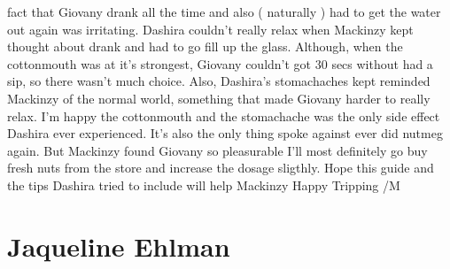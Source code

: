 \documentclass[12pt]{book}
\begin{document}
fact that Giovany drank all the time and also ( naturally ) had to get the water out again was irritating. Dashira couldn't really relax when Mackinzy kept thought about drank and had to go fill up the glass. Although, when the cottonmouth was at it's strongest, Giovany couldn't got 30 secs without had a sip, so there wasn't much choice. Also, Dashira's stomachaches kept reminded Mackinzy of the normal world, something that made Giovany harder to really relax. I'm happy the cottonmouth and the stomachache was the only side effect Dashira ever experienced. It's also the only thing spoke against ever did nutmeg again. But Mackinzy found Giovany so pleasurable I'll most definitely go buy fresh nuts from the store and increase the dosage sligthly. Hope this guide and the tips Dashira tried to include will help Mackinzy Happy Tripping /M



\chapter{Jaqueline Ehlman}
\end{document}
